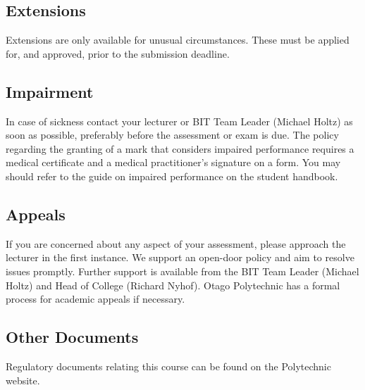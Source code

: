 \documentclass{article}
\begin{document}
\subsection*{Extensions}
Extensions are only available for unusual circumstances. These must be applied for, and approved, prior to the submission deadline.

\subsection*{Impairment}
In case of sickness contact your lecturer or BIT Team Leader (Michael Holtz) as soon as possible, preferably before the assessment or exam is due. The policy regarding the granting of a mark that considers impaired performance requires a medical certificate and a medical practitioner’s signature on a form. You may should refer to the guide on impaired performance on the student handbook.

\subsection*{Appeals}
If you are concerned about any aspect of your assessment, please approach the lecturer in the first instance. We support an open-door policy and aim to resolve issues promptly. Further support is available from the BIT Team Leader (Michael Holtz) and Head of College (Richard Nyhof). Otago Polytechnic has a formal process for academic appeals if necessary.

\subsection*{Other Documents}
Regulatory documents relating this course can be found on the Polytechnic website.
\end{document}

